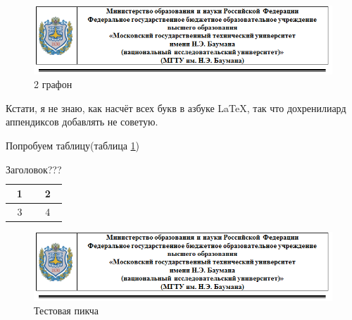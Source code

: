 \documentclass{article}
\begin{document}
\begin{figure}[h!]
	\centering
	\includegraphics[width=0.7\linewidth]{For_title}
	\caption{2 графон}
	\label{fig:app2}
\end{figure}

\Appendix

Кстати, я не знаю, как насчёт всех букв в азбуке \LaTeX, так что дохренилиард аппендиксов добавлять не советую.

Попробуем таблицу(таблица \ref{tab:tab})

\begin{table}[h!]
	\caption{Заголовок???}
	\centering
	\begin{tabular}{|c|c|}
		\hline 
		1 & 2 \\ 
		\hline 
		3 & 4 \\ 
		\hline 
	\end{tabular}
\label{tab:tab}
\end{table}

\begin{figure}[h!]
	\centering
	\includegraphics[width=0.7\linewidth]{For_title}
	\caption{Тестовая пикча}
	\label{fig:fortitle3}
\end{figure}

\Appendix


\Finish
\end{document}
